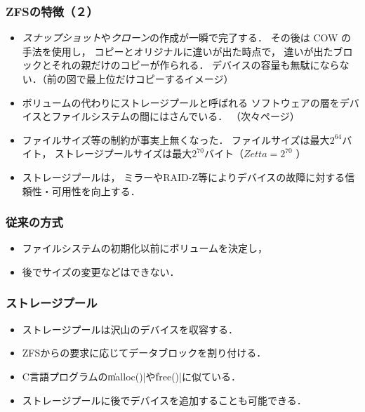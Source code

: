 \documentclass[unicode]{beamer}                   %
\begin{document}
\begin{frame}
  \frametitle{ZFSの特徴（２）}
  \begin{itemize}
  \item \emph{スナップショット}や\emph{クローン}の作成が一瞬で完了する．
    その後は COW の手法を使用し，
    コピーとオリジナルに違いが出た時点で，
    違いが出たブロックとそれの親だけのコピーが作られる．
    デバイスの容量も無駄にならない．（前の図で最上位だけコピーするイメージ）
  \item ボリュームの代わりにストレージプールと呼ばれる
    ソフトウェアの層をデバイスとファイルシステムの間にはさんでいる．
    （次々ページ）
  \item ファイルサイズ等の制約が事実上無くなった．
    ファイルサイズは最大$2^{64}$バイト，
    ストレージプールサイズは最大$2^{70}$バイト（$Zetta = 2^{70}$ ）
  \item ストレージプールは，
    ミラーやRAID-Z等によりデバイスの故障に対する信頼性・可用性を向上する．
  \end{itemize}
  \vfill
\end{frame}

\begin{frame}[fragile]
  \frametitle{従来の方式}
  \begin{itemize}
  \item ファイルシステムの初期化以前にボリュームを決定し，
  \item 後でサイズの変更などはできない．
  \end{itemize}
  \vfill
\end{frame}
  
\begin{frame}[fragile]
  \frametitle{ストレージプール}
  \begin{itemize}
  \item ストレージプールは沢山のデバイスを収容する．
  \item ZFSからの要求に応じてデータブロックを割り付ける．
  \item C言語プログラムの\|malloc()|や\|free()|に似ている．
  \item ストレージプールに後でデバイスを追加することも可能できる．
  \end{itemize}
  \vfill
\end{frame}
  
\end{document}
